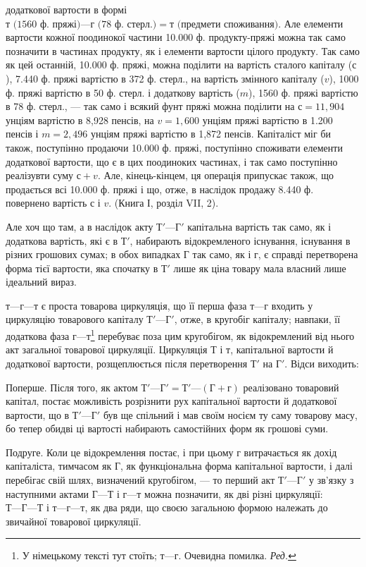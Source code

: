 \parcont{}  %
додаткової вартости в формі
$т\text{ (1560 ф. пряжі)} — г\text{ (78 ф. стерл.)} = т\text{ (предмети споживання)}$.
Але елементи вартости кожної поодинокої частини
10.000  ф. продукту-пряжі можна так само позначити в частинах продукту,
як і елементи вартости цілого продукту. Так само як цей останній, 10.000 ф. пряжі, можна поділити на
вартість сталого капіталу ($с$), 7.440 ф.
пряжі вартістю в 372 ф. стерл., на вартість змінного капіталу ($v$), 1000 ф.
пряжі вартістю в 50 ф. стерл. і додаткову вартість ($m$), 1560 ф. пряжі
вартістю в 78 ф. стерл., — так само і всякий фунт пряжі можна поділити
на $с = 11,904$ унціям вартістю в 8,928 пенсів, на $v = 1,600$ унціям пряжі
вартістю в 1.200 пенсів і $m = 2,496$ унціям пряжі вартістю в 1,872 пенсів.
Капіталіст міг би також, поступінно продаючи 10.000 ф. пряжі, поступінно
споживати елементи додаткової вартости, що є в цих поодиноких частинах,
і так само поступінно реалізувти суму $с + v$. Але, кінець-кінцем, ця операція
припускає також, що продається всі 10.000 ф. пряжі і що, отже, в наслідок
продажу 8.440 ф. повернено вартість $с$ і $v$. (Книга І, розділ VII, 2).

Але хоч що там, а в наслідок акту $Т' — Г'$ капітальна вартість так
само, як і додаткова вартість, які є в $Т'$, набирають відокремленого
існування, існування в різних грошових сумах; в обох випадках $Г$ так
само, як і $г$, є справді перетворена форма тієї вартости, яка спочатку
в $Т'$ лише як ціна товару мала власний лише ідеальний вираз.

$т — г — т$ є проста товарова циркуляція, що її перша фаза $т — г$ входить
у циркуляцію товарового капіталу $Т' — Г'$, отже, в кругобіг капіталу;
навпаки, її додаткова фаза $г — т$\footnote*{
У німецькому тексті тут стоїть; $т — г$. Очевидна помилка. \emph{Ред.}
} перебуває поза цим кругобігом, як
відокремлений від нього акт загальної товарової циркуляції. Циркуляція
$Т$ і $т$, капітальної вартости й додаткової вартости, розщеплюється після
перетворення $Т'$ на $Г'$. Відси виходить:

Поперше. Після того, як актом $Т' — Г' = Т' — (Г + г)$ реалізовано
товаровий капітал, постає можливість розрізнити рух капітальної
вартости й додаткової вартости, що в $Т' — Г'$ був ще спільний і мав своїм
носієм ту саму товарову масу, бо тепер обидві ці вартості набирають
самостійних форм як грошові суми.

Подруге. Коли це відокремлення постає, і при цьому г витрачається
як дохід капіталіста, тимчасом як $Г$, як функціональна форма капітальної
вартости, і далі перебігає свій шлях, визначений кругобігом, — то перший
акт $Т' — Г'$ у зв’язку з наступними актами $Г — Т$ і $г — т$ можна позначити,
як дві різні циркуляції: $Т — Г — Т$ і $т — г — т$, як два ряди, що своєю
загальною формою належать до звичайної товарової циркуляції.

